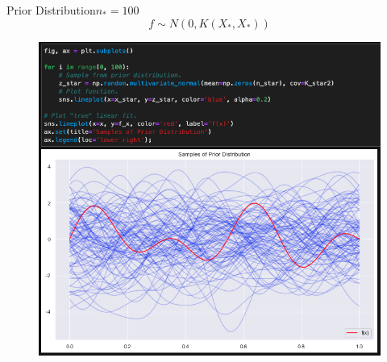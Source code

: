 \documentclass[10pt]{beamer}
\begin{document}
\begin{frame}{Prior Distribution}{$n_*=100$}
$$
f \sim N(0, K(X_*,X_*))
$$
\begin{center}
\begin{figure}
\includegraphics[scale=0.3]{images/code_sample_prior_example2.png} 
\end{figure}
\end{center}
\end{frame}
\end{document}
